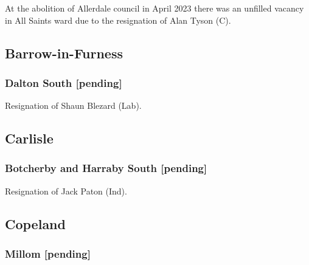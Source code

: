 \documentclass[a4paper,openany]{book}
\begin{document}
\begin{resultsiii}
At the abolition of Allerdale council in April 2023 there was an unfilled vacancy in All Saints ward due to the resignation of Alan Tyson (C).%

\subsection*{Barrow-in-Furness}

\subsubsection*{Dalton South \hspace*{\fill}\nolinebreak[1]%
	\enspace\hspace*{\fill}
	[pending]}


Resignation of Shaun Blezard (Lab).

\subsection*{Carlisle}

\subsubsection*{Botcherby and Harraby South \hspace*{\fill}\nolinebreak[1]%
	\enspace\hspace*{\fill}
	[pending]}


Resignation of Jack Paton (Ind).

\subsection*{Copeland}

\subsubsection*{Millom \hspace*{\fill}\nolinebreak[1]%
	\enspace\hspace*{\fill}
	[pending]}



\end{resultsiii}
\end{document}
